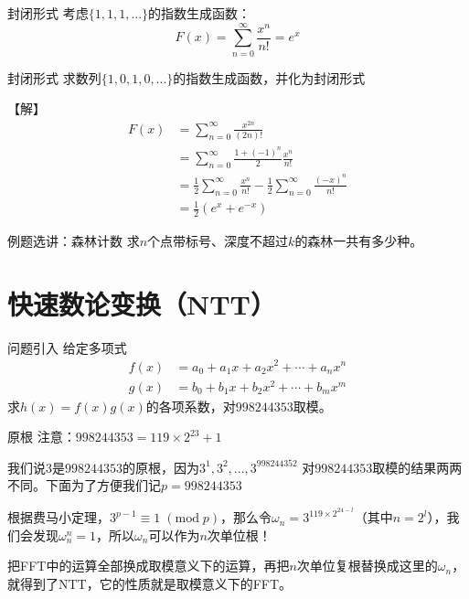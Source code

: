 \documentclass{beamer}
\begin{document}
\begin{frame}{封闭形式}
    考虑$\{1,1,1,...\}$的指数生成函数：
    \begin{equation*}
        F(x)=\sum_{n=0}^\infty \frac{x^n}{n!}=e^x
    \end{equation*}
\end{frame}

\begin{frame}{封闭形式}
    求数列$\{1,0,1,0,...\}$的指数生成函数，并化为封闭形式

    \vspace{1em}\pause
    【解】
    \begin{align*}
        F(x)&=\sum_{n=0}^\infty \frac{x^{2n}}{(2n)!}\\
        &= \sum_{n=0}^\infty \frac{1+(-1)^n}{2} \frac{x^{n}}{n!}\\
        &= \frac{1}{2} \sum_{n=0}^\infty \frac{x^n}{n!} - \frac{1}{2} \sum_{n=0}^\infty \frac{(-x)^n}{n!}\\
        &= \frac{1}{2}\left(e^x+e^{-x}\right)
    \end{align*}
\end{frame}

\begin{frame}{例题选讲：森林计数}
    求$n$个点带标号、深度不超过$k$的森林一共有多少种。
\end{frame}

\section{快速数论变换（NTT）}

\begin{frame}{问题引入}
    给定多项式
    \begin{align*}
        f(x) &= a_0 + a_1x + a_2x^2 + \cdots + a_nx^n\\
        g(x) &= b_0 + b_1x + b_2x^2 + \cdots + b_mx^m
    \end{align*}
    求$h(x)=f(x)g(x)$的各项系数，对$998244353$取模。
\end{frame}

\begin{frame}{原根}
    注意：$998244353=119 \times 2^{23} + 1$

    \vspace{1em}
    我们说$3$是$998244353$的原根，因为$3^1,3^2,...,3^{998244352}$ 对$998244353$取模的结果两两不同。下面为了方便我们记$p=998244353$
    
    \vspace{1em}\pause
    根据费马小定理，$3^{p-1}\equiv 1\;(\text{mod}\;p)$，那么令$\omega_n=3^{119\times 2^{24-l}}$（其中$n=2^l$），我们会发现$\omega_{n}^{n}=1$，所以$\omega_n$可以作为$n$次单位根！

    \vspace{1em}\pause
    把FFT中的运算全部换成取模意义下的运算，再把$n$次单位复根替换成这里的$\omega_n$，就得到了NTT，它的性质就是取模意义下的FFT。
\end{frame}
\end{document}
